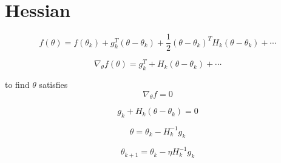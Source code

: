 \documentclass[12pt,a4paper]{article}
\begin{document}
\section{Hessian}
\[
f(\theta) = f(\theta_k) + g_k^{T}(\theta-\theta_k) + \frac{1}{2}(\theta-\theta_k)^TH_k(\theta-\theta_k) + \cdots
\]

\[
\nabla_{\theta}f(\theta) = g_k^{T} + H_k(\theta-\theta_k) + \cdots
\]

to find $\theta$ satisfies
\[
\nabla_{\theta}f = 0
\]

\[
g_k + H_k(\theta - \theta_k) = 0
\]

\[
\theta = \theta_k - H_k^{-1}g_k
\]

\[
\theta_{k+1} = \theta_k - \eta H_k^{-1}g_k
\]
\end{document}
